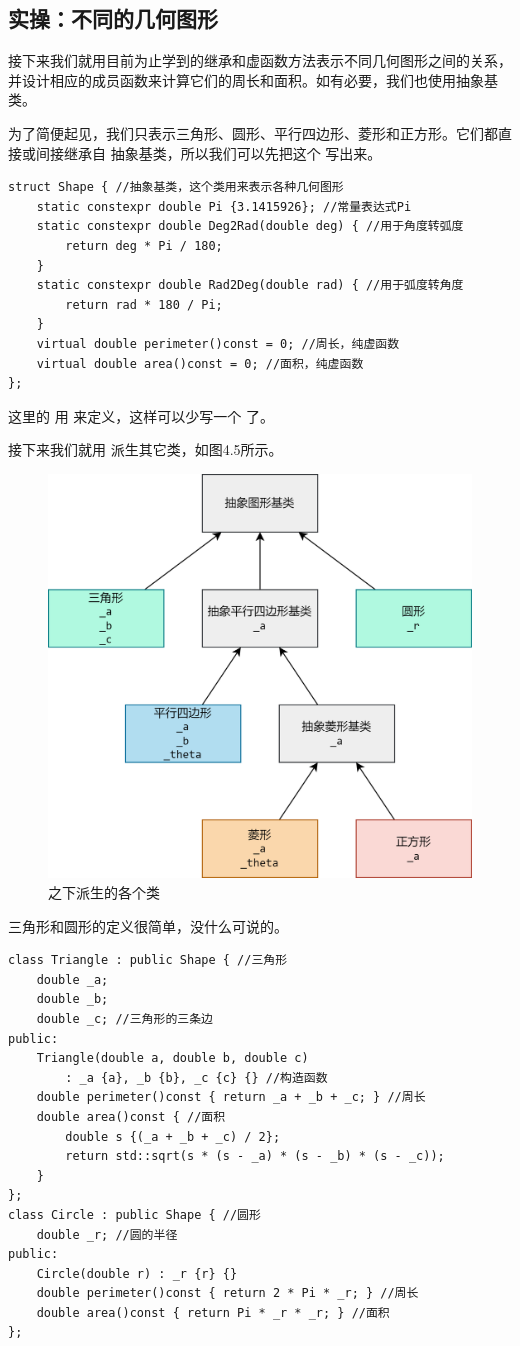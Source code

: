 \subsection*{实操：不同的几何图形}
接下来我们就用目前为止学到的继承和虚函数方法表示不同几何图形之间的关系，并设计相应的成员函数来计算它们的周长和面积。如有必要，我们也使用抽象基类。\par
为了简便起见，我们只表示三角形、圆形、平行四边形、菱形和正方形。它们都直接或间接继承自 \lstinline@Shape@ 抽象基类，所以我们可以先把这个 \lstinline@Shape@ 写出来。
\begin{lstlisting}
struct Shape { //抽象基类，这个类用来表示各种几何图形
    static constexpr double Pi {3.1415926}; //常量表达式Pi
    static constexpr double Deg2Rad(double deg) { //用于角度转弧度
        return deg * Pi / 180;
    }
    static constexpr double Rad2Deg(double rad) { //用于弧度转角度
        return rad * 180 / Pi;
    }
    virtual double perimeter()const = 0; //周长，纯虚函数
    virtual double area()const = 0; //面积，纯虚函数
};
\end{lstlisting}
这里的 \lstinline@Shape@ 用 \lstinline@struct@ 来定义，这样可以少写一个 \lstinline@public@ 了。\par
接下来我们就用 \lstinline@Shape@ 派生其它类，如图4.5所示。\par
\begin{figure}[htbp]
    \centering
    \includegraphics[width=.6\textwidth]{../images/generalized_parts/10_abstract_shape_class.png}
    \caption{\lstinline@Shape@ 之下派生的各个类}
\end{figure}
三角形和圆形的定义很简单，没什么可说的。
\begin{lstlisting}
class Triangle : public Shape { //三角形
    double _a;
    double _b;
    double _c; //三角形的三条边
public:
    Triangle(double a, double b, double c)
        : _a {a}, _b {b}, _c {c} {} //构造函数
    double perimeter()const { return _a + _b + _c; } //周长
    double area()const { //面积
        double s {(_a + _b + _c) / 2};
        return std::sqrt(s * (s - _a) * (s - _b) * (s - _c));
    }
};
class Circle : public Shape { //圆形
    double _r; //圆的半径
public:
    Circle(double r) : _r {r} {}
    double perimeter()const { return 2 * Pi * _r; } //周长
    double area()const { return Pi * _r * _r; } //面积
};
\end{lstlisting}

